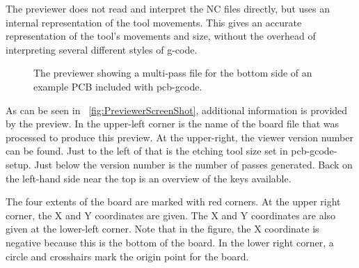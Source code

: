 \documentclass[11pt]{book}
\begin{document}
The previewer does not read and interpret the NC files directly, but uses an internal representation of the tool movements. This gives an accurate representation of the tool's movements and size, without the overhead of interpreting several different styles of g-code.

\begin{figure}
	\caption{The previewer showing a multi-pass file for the bottom side of an example PCB included with pcb-gcode.}
	\label{fig:PreviewerScreenShot}
\end{figure}

As can be seen in \figurename~\vref{fig:PreviewerScreenShot}, additional information is provided by the preview. In the upper-left corner is the name of the board file that was processed to produce this preview. At the upper-right, the viewer version number can be found. Just to the left of that is the etching tool size set in pcb-gcode-setup. Just below the version number is the number of passes generated. Back on the left-hand side near the top is an overview of the keys available.

The four extents of the board are marked with red corners. At the upper right corner, the X and Y coordinates are given. The X and Y coordinates are also given at the lower-left corner. Note that in the figure, the X coordinate is negative because this is the bottom of the board. In the lower right corner, a circle and crosshairs mark the origin point for the board.
\end{document}
